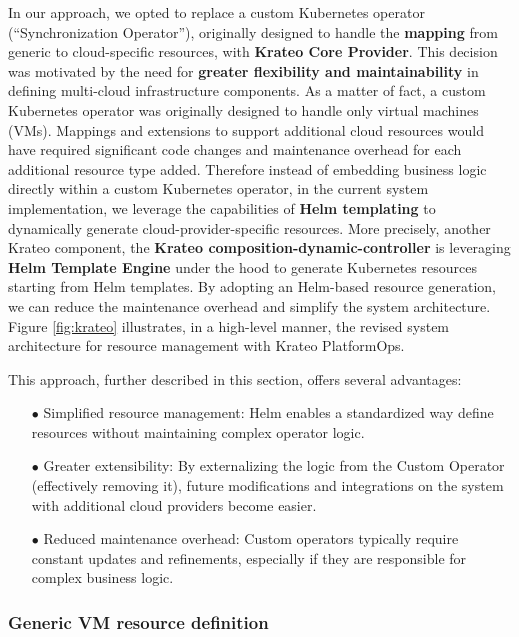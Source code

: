 In our approach, we opted to replace a custom Kubernetes operator (``Synchronization Operator''), originally designed to handle the \textbf{mapping} from generic to cloud-specific resources, with \textbf{Krateo Core Provider}. 
This decision was motivated by the need for \textbf{greater flexibility and maintainability} in defining multi-cloud infrastructure components. 
As a matter of fact, a custom Kubernetes operator was originally designed to handle only virtual machines (VMs).
Mappings and extensions to support additional cloud resources would have required significant code changes and maintenance overhead for each additional resource type added.
Therefore instead of embedding business logic directly within a custom Kubernetes operator, in the current system implementation, we leverage the capabilities of \textbf{Helm templating} to dynamically generate cloud-provider-specific resources. 
More precisely, another Krateo component, the \textbf{Krateo composition-dynamic-controller} is leveraging \textbf{Helm Template Engine} under the hood to generate Kubernetes resources starting from Helm templates.
By adopting an Helm-based resource generation, we can reduce the maintenance overhead and simplify the system architecture.
Figure \ref{fig:krateo} illustrates, in a high-level manner, the revised system architecture for resource management with Krateo PlatformOps.

This approach, further described in this section, offers several advantages:
\begin{itemize}[itemsep=0.2pt, topsep=1pt]
  \item[$\bullet$] Simplified resource management: Helm enables a standardized way define resources without maintaining complex operator logic.
  \item[$\bullet$] Greater extensibility: By externalizing the logic from the Custom Operator (effectively removing it), future modifications and integrations on the system with additional cloud providers become easier.
  \item[$\bullet$] Reduced maintenance overhead: Custom operators typically require constant updates and refinements, especially if they are responsible for complex business logic. 
\end{itemize}

\subsubsection{Generic VM resource definition}


